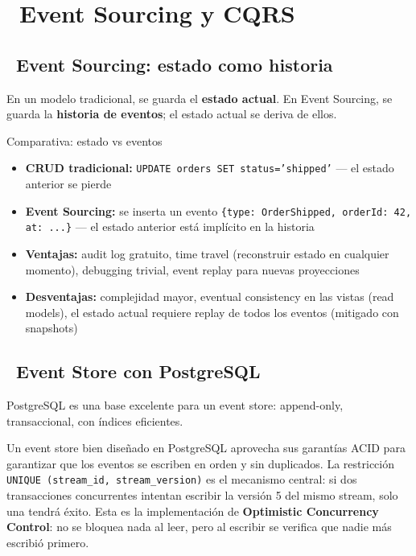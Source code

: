 \chapter[Event Sourcing y CQRS]{~Event Sourcing y CQRS}

\section[Event Sourcing: estado como historia]{~Event Sourcing: estado como historia}

En un modelo tradicional, se guarda el \textbf{estado actual}.
En Event Sourcing, se guarda la \textbf{historia de eventos}; el estado actual se deriva de ellos.

\begin{teoriabox}{Comparativa: estado vs eventos}
\begin{itemize}
  \item \textbf{CRUD tradicional:} \texttt{UPDATE orders SET status='shipped'} — el estado anterior se pierde
  \item \textbf{Event Sourcing:} se inserta un evento \texttt{\{type: OrderShipped, orderId: 42, at: ...\}} — el estado anterior está implícito en la historia
  \item \textbf{Ventajas:} audit log gratuito, time travel (reconstruir estado en cualquier momento), debugging trivial, event replay para nuevas proyecciones
  \item \textbf{Desventajas:} complejidad mayor, eventual consistency en las vistas (read models), el estado actual requiere replay de todos los eventos (mitigado con snapshots)
\end{itemize}
\end{teoriabox}

\section[Event Store con PostgreSQL]{~Event Store con PostgreSQL}

PostgreSQL es una base excelente para un event store: append-only, transaccional, con índices eficientes.

Un event store bien diseñado en PostgreSQL aprovecha sus garantías ACID para garantizar que los eventos se escriben en orden y sin duplicados.
La restricción \texttt{UNIQUE (stream\_id, stream\_version)} es el mecanismo central: si dos transacciones concurrentes intentan escribir la versión 5 del mismo stream, solo una tendrá éxito.
Esta es la implementación de \textbf{Optimistic Concurrency Control}: no se bloquea nada al leer, pero al escribir se verifica que nadie más escribió primero.

